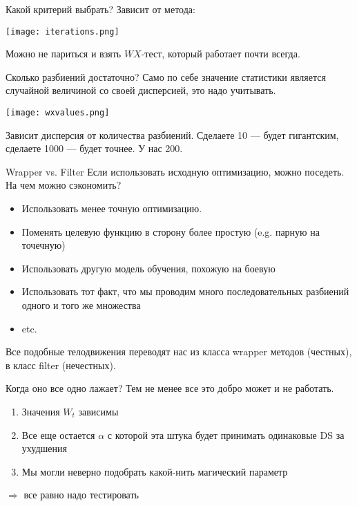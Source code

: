 \documentclass[14pt, fleqn, xcolor={dvipsnames, table}]{beamer}
\begin{document}
\begin{frame}{Какой критерий выбрать?}{}
Зависит от метода:
\begin{center}
\texttt{[image: iterations.png]}
\end{center}
Можно не париться и взять $WX$-тест, который работает почти всегда. 
\end{frame}

\begin{frame}{Сколько разбиений достаточно?}
\small
Само по себе значение статистики является случайной величиной со своей дисперсией, это надо учитывать.
\begin{center}
\texttt{[image: wxvalues.png]}
\end{center}
Зависит дисперсия от количества разбиений. Сделаете 10 --- будет гигантским, сделаете 1000 --- будет точнее. У нас 200. 
\end{frame}

\begin{frame}{Wrapper vs. Filter}
\small
Если использовать исходную оптимизацию, можно поседеть. На чем можно сэкономить?
\begin{itemize}
  \item Использовать менее точную оптимизацию.
  \item Поменять целевую функцию в сторону более простую (e.g. парную на точечную)
  \item Использовать другую модель обучения, похожую на боевую
  \item Использовать тот факт, что мы проводим много последовательных разбиений одного и того же множества
  \item etc.
\end{itemize}
Все подобные телодвижения переводят нас из класса wrapper методов (честных), в класс filter (нечестных).
\end{frame}

\begin{frame}{Когда оно все одно лажает?}
Тем не менее все это добро может и не работать. 
\begin{enumerate}
  \item Значения $W_t$ зависимы
  \item Все еще остается $\alpha$ с которой эта штука будет принимать одинаковые DS за ухудшения
  \item Мы могли неверно подобрать какой-нить магический параметр
\end{enumerate}
$\Rightarrow$ все равно надо тестировать
\end{frame}
\end{document}
